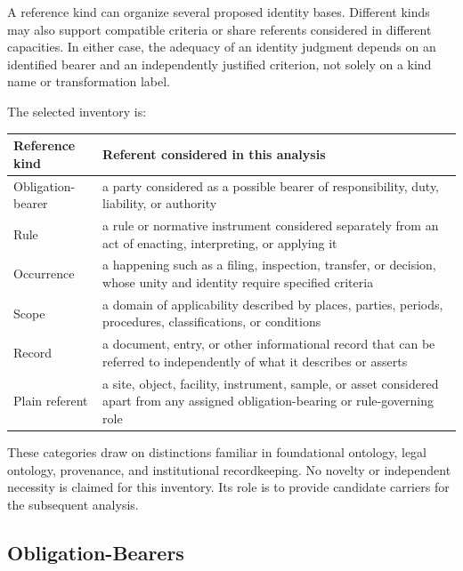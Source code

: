 A reference kind can organize several proposed identity bases.
Different kinds may also support compatible criteria or share referents
considered in different capacities.
In either case, the adequacy of
an identity judgment depends on an identified bearer and an independently
justified criterion, not solely on a kind name or transformation label.

The selected inventory is:

\begin{center}
  \begin{tabular}{@{}l>{\raggedright\arraybackslash}p{}@{}}
    \toprule
    Reference kind & Referent considered in this analysis \\
    \midrule
    Obligation-bearer &
    a party considered as a possible bearer of responsibility, duty,
    liability, or authority \\
    Rule &
    a rule or normative instrument considered separately from an act
    of enacting, interpreting, or applying it \\
    Occurrence &
    a happening such as a filing, inspection, transfer, or decision,
    whose unity and identity require specified criteria \\
    Scope &
    a domain of applicability described by places, parties, periods,
    procedures, classifications, or conditions \\
    Record &
    a document, entry, or other informational record that can be
    referred to independently of what it describes or asserts \\
    Plain referent &
    a site, object, facility, instrument, sample, or asset considered
    apart from any assigned obligation-bearing or rule-governing role \\
    \bottomrule
  \end{tabular}
\end{center}

These categories draw on distinctions familiar in foundational ontology,
legal ontology, provenance, and institutional recordkeeping.
No novelty or independent necessity is claimed for this inventory.
Its role is to provide candidate carriers for the subsequent analysis.

\subsection{Obligation-Bearers}
\label{subsec:inventory_obligation_bearers}

